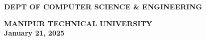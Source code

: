 {    \vspace{0.3cm}
    \fontsize{14}{16}\selectfont \textbf{DEPT OF COMPUTER SCIENCE \& ENGINEERING}\\
    \vspace{0.1cm}
    \begin{center}
        \fontsize{14}{16}\selectfont \textbf{MANIPUR TECHNICAL UNIVERSITY}\\
        \vspace{1cm}
        \fontsize{14}{16}\selectfont \textbf{January 21, 2025}\\
    \end{center}}
    
